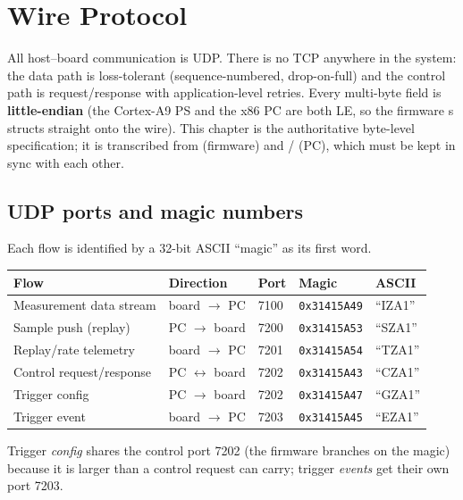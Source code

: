 \chapter{Wire Protocol}
\label{ch:protocol}

All host--board communication is UDP. There is no TCP anywhere in the system:
the data path is loss-tolerant (sequence-numbered, drop-on-full) and the control
path is request/response with application-level retries. Every multi-byte field
is \textbf{little-endian} (the Cortex-A9 PS and the x86 PC are both LE, so the
firmware s structs straight onto the wire). This chapter is the
authoritative byte-level specification; it is transcribed from
 (firmware) and /
(PC), which must be kept in sync with each other.

\section{UDP ports and magic numbers}
\label{sec:ports}

Each flow is identified by a 32-bit ASCII ``magic'' as its first word.

\begin{center}
\begin{tabular}{@{}l l l l l@{}}
\toprule
Flow & Direction & Port & Magic & ASCII \\
\midrule
Measurement data stream & board $\to$ PC & 7100 & \texttt{0x31415A49} & ``IZA1'' \\
Sample push (replay)    & PC $\to$ board & 7200 & \texttt{0x31415A53} & ``SZA1'' \\
Replay/rate telemetry   & board $\to$ PC & 7201 & \texttt{0x31415A54} & ``TZA1'' \\
Control request/response& PC $\leftrightarrow$ board & 7202 & \texttt{0x31415A43} & ``CZA1'' \\
Trigger config          & PC $\to$ board & 7202 & \texttt{0x31415A47} & ``GZA1'' \\
Trigger event           & board $\to$ PC & 7203 & \texttt{0x31415A45} & ``EZA1'' \\
\bottomrule
\end{tabular}
\end{center}

Trigger \emph{config} shares the control port 7202 (the firmware
 branches on the magic) because it is larger than a
control request can carry; trigger \emph{events} get their own port 7203.

